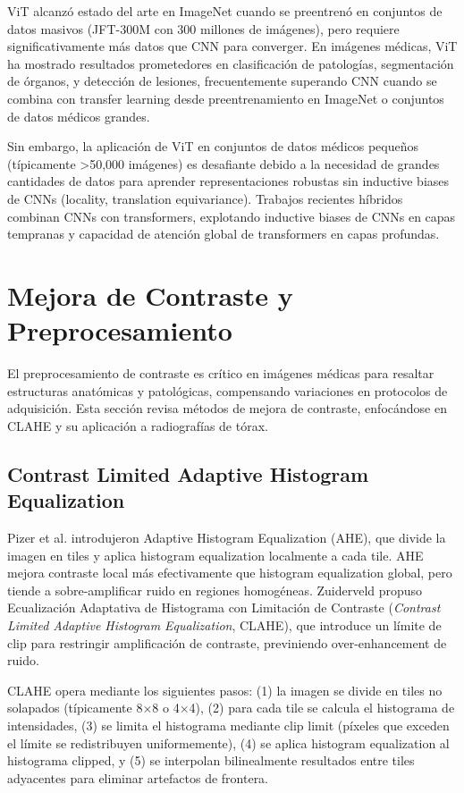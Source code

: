 ViT alcanzó estado del arte en ImageNet cuando se preentrenó en conjuntos de datos masivos (JFT-300M con 300 millones de imágenes), pero requiere significativamente más datos que CNN para converger. En imágenes médicas, ViT ha mostrado resultados prometedores en clasificación de patologías, segmentación de órganos, y detección de lesiones, frecuentemente superando CNN cuando se combina con transfer learning desde preentrenamiento en ImageNet o conjuntos de datos médicos grandes.

Sin embargo, la aplicación de ViT en conjuntos de datos médicos pequeños (típicamente \textgreater50,000 imágenes) es desafiante debido a la necesidad de grandes cantidades de datos para aprender representaciones robustas sin inductive biases de CNNs (locality, translation equivariance). Trabajos recientes híbridos combinan CNNs con transformers, explotando inductive biases de CNNs en capas tempranas y capacidad de atención global de transformers en capas profundas.

\section{Mejora de Contraste y Preprocesamiento}
\label{sec:mejora_contraste}

El preprocesamiento de contraste es crítico en imágenes médicas para resaltar estructuras anatómicas y patológicas, compensando variaciones en protocolos de adquisición. Esta sección revisa métodos de mejora de contraste, enfocándose en CLAHE y su aplicación a radiografías de tórax.

\subsection{Contrast Limited Adaptive Histogram Equalization}

Pizer et al. \cite{pizer1987adaptive} introdujeron Adaptive Histogram Equalization (AHE), que divide la imagen en tiles y aplica histogram equalization localmente a cada tile. AHE mejora contraste local más efectivamente que histogram equalization global, pero tiende a sobre-amplificar ruido en regiones homogéneas. Zuiderveld \cite{clahe1994} propuso Ecualización Adaptativa de Histograma con Limitación de Contraste (\textit{Contrast Limited Adaptive Histogram Equalization}, CLAHE), que introduce un límite de clip para restringir amplificación de contraste, previniendo over-enhancement de ruido.

CLAHE opera mediante los siguientes pasos: (1) la imagen se divide en tiles no solapados (típicamente 8$\times$8 o 4$\times$4), (2) para cada tile se calcula el histograma de intensidades, (3) se limita el histograma mediante clip limit (píxeles que exceden el límite se redistribuyen uniformemente), (4) se aplica histogram equalization al histograma clipped, y (5) se interpolan bilinealmente resultados entre tiles adyacentes para eliminar artefactos de frontera.

